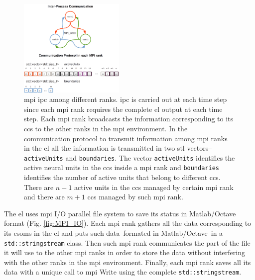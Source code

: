 \documentclass[10pt,journal,compsoc]{IEEEtran}
\begin{document}
\begin{figure}[h!]
    \centering
    \includegraphics[width=0.45\textwidth]{BCast.png}
    \caption{ \gls{mpi} \gls{ipc} among different ranks. \gls{ipc} is carried out at each time step since each \gls{mpi} rank requires the complete \gls{el} output at each time step. Each \gls{mpi} rank broadcasts the information corresponding to its \glspl{cc} to the other ranks in the \gls{mpi} environment. In the communication protocol to transmit information among \gls{mpi} ranks in the \gls{el} all the information is transmitted in two \gls{stl} vectors--\texttt{activeUnits} and \texttt{boundaries}. The vector \texttt{activeUnits} identifies the active neural units in the \glspl{cc} inside a \gls{mpi} rank and \texttt{boundaries} identifies the number of active units that belong to different \glspl{cc}. There are $n+1$ active units in the \glspl{cc} managed by certain \gls{mpi} rank and there are $m+1$ \glspl{cc} managed by such \gls{mpi} rank.}
    \label{fig:BCast}
\end{figure}

The \gls{el} uses \gls{mpi} I/O parallel file system to save its status in Matlab/Octave format (Fig. \ref{fig:MPI_IO}). Each \gls{mpi} rank gathers all the data corresponding to its \glspl{csom} in the \gls{el} and puts such data--formated in Matlab/Octave--in a \texttt{std::stringstream} class. Then such \gls{mpi} rank communicates the part of the file it will use to the other \gls{mpi} ranks in order to store the data without interfering with the other ranks in the \gls{mpi} environment. Finally, each \gls{mpi} rank saves all its data with a unique call to \gls{mpi} Write using the complete \texttt{std::stringstream}.
\end{document}
